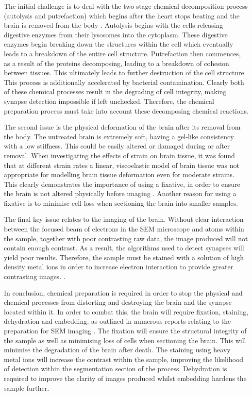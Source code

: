 \documentclass[a4paper, 11pt]{article}
\numberwithin{equation}{section}
\begin{document}
The initial challenge is to deal with the two stage chemical decomposition process (autolysis and putrefaction) which begins after the heart stops beating and the brain is removed from the body \cite{SoilAnalysisinForensicTaphonomy}. Autolysis begins with the cells releasing digestive enzymes from their lysosomes into the cytoplasm. These digestive enzymes begin breaking down the structures within the cell which eventually leads to a breakdown of the entire cell structure. Putrefaction then commences, as a result of the proteins decomposing, leading to a breakdown of cohesion between tissues. This ultimately leads to further destruction of the cell structure. This process is additionally accelerated by bacterial contamination. Clearly both of these chemical processes result in the degrading of cell integrity, making synapse detection impossible if left unchecked. Therefore, the chemical preparation process must take into account these decomposing chemical reactions. 

The second issue is the physical deformation of the brain after its removal from the body. The untreated brain is extremely soft, having a gel-like consistency with a low stiffness. This could be easily altered or damaged during or after removal. When investigating the effects of strain on brain tissue, it was found that at different strain rates a linear, viscoelastic model of brain tissue was not appropriate for modelling brain tissue deformation even for moderate strains. This clearly demonstrates the importance of using a fixative, in order to ensure the brain is not altered physically before imaging \cite{Miller2002483} \cite{Miller20001369}. Another reason for using a fixative is to minimise cell loss when sectioning the brain into smaller samples. 

The final key issue relates to the imaging of the brain. Without clear interaction between the focused beam of electrons in the SEM microscope and atoms within the sample, together with poor contrasting raw data, the image produced will not contain enough contrast. As a result, the algorithms used to detect synapses will yield poor results. Therefore, the sample must be stained with a solution of high density metal ions in order to increase electron interaction to provide greater contrasting images. \cite{HeavyMetalsWatson}.

In conclusion, chemical preparation is required in order to stop the physical and chemical processes from distorting and destroying the brain and the synapse located within it. In order to combat this, the brain will require fixation, staining, dehydration and embedding, as outlined in numerous reports relating to the preparation for SEM imaging \cite{wholemousebrain2012} 
\cite{Knott2011}. The fixation will ensure the structural integrity of the sample as well as minimising loss of cells when sectioning the brain. This will minimise the degradation of the brain after death. The staining using heavy metal ions will increase the contrast within the sample, improving the likelihood of detection within the segmentation section of the process. Dehydration is required to improve the clarity of images produced whilst embedding hardens the sample further. 
\end{document}
